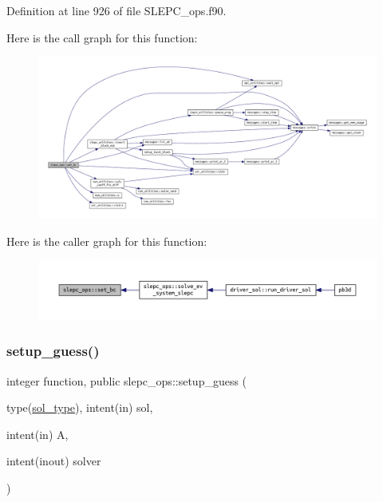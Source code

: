 Definition at line 926 of file S\+L\+E\+P\+C\+\_\+ops.\+f90.

Here is the call graph for this function\+:\nopagebreak
\begin{figure}[H]
\begin{center}
\leavevmode
\includegraphics[width=350pt]{namespaceslepc__ops_a05f8a23335ed47ad1996cddf3bcfdc2e_cgraph}
\end{center}
\end{figure}
Here is the caller graph for this function\+:\nopagebreak
\begin{figure}[H]
\begin{center}
\leavevmode
\includegraphics[width=350pt]{namespaceslepc__ops_a05f8a23335ed47ad1996cddf3bcfdc2e_icgraph}
\end{center}
\end{figure}
\mbox{\label{namespaceslepc__ops_a17a57b58ac6ca48ff4bdb44e8689bb19}} 
\subsubsection{\texorpdfstring{setup\+\_\+guess()}{setup\_guess()}}
{\footnotesize\ttfamily integer function, public slepc\+\_\+ops\+::setup\+\_\+guess (\begin{DoxyParamCaption}\item[{type(\hyperlink{structsol__vars_1_1sol__type}{sol\+\_\+type}), intent(in)}]{sol,  }\item[{intent(in)}]{A,  }\item[{intent(inout)}]{solver }\end{DoxyParamCaption})}



